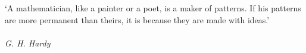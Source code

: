 
\clearpage

\narrowlinespacing

\vspace*{4mm}

`A mathematician, like a painter or a poet, is a maker of patterns. If his patterns are more permanent than
  theirs, it is because they are made with ideas.'\\
\\
\emph{G. H. Hardy}

\normallinespacing
